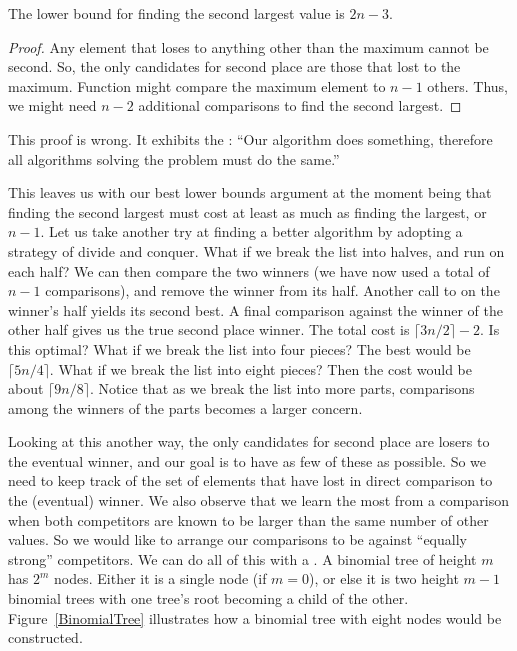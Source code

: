 \begin{theorem}
The lower bound for finding the second largest value is \(2n-3\).
\end{theorem}

\begin{proof}
Any element that loses to anything other than the maximum cannot be
second.
So, the only candidates for second place are those that lost to the
maximum.
Function  might compare the maximum element  to \(n-1\)
others.
Thus, we might need \(n-2\) additional comparisons to find the second
largest.
\end{proof}

This proof is wrong.
It exhibits the :
``Our algorithm does something, therefore all algorithms solving
the problem must do the same.''

This leaves us with our best lower bounds argument at the moment
being that finding the second largest must cost at least as much as
finding the largest, or \(n-1\).
Let us take another try at finding a better algorithm by adopting a
strategy of divide and conquer.
What if we break the list into halves, and run  on each
half?
We can then compare the two winners (we have now used a total of
\(n-1\) comparisons), and remove the winner from its half.
Another call to  on the winner's half yields its second
best.
A final comparison against the winner of the other half gives us the
true second place winner.
The total cost is \(\lceil 3n/2\rceil - 2\).
Is this optimal?
What if we break the list into four pieces?
The best would be \(\lceil 5n/4\rceil\).
What if we break the list into eight pieces?
Then the cost would be about \(\lceil 9n/8\rceil\).
Notice that as we break the list into more parts,
comparisons among the winners of the parts becomes a larger concern.

Looking at this another way, the only candidates for second place
are losers to the eventual winner, and our goal is to have as few of
these as possible.
So we need to keep track of the set of elements that have lost
in direct comparison to the (eventual) winner.
We also observe that we learn the most from a comparison when both
competitors are known to be larger than the same number of other
values.
So we would like to arrange our comparisons to be against ``equally
strong'' competitors.
We can do all of this with a .
A binomial tree of height \(m\) has \(2^m\) nodes.
Either it is a single node (if \(m=0\)), or else it is
two height \(m-1\) binomial trees with one tree's root becoming
a child of the other.
Figure~\ref{BinomialTree} illustrates how a binomial tree with eight
nodes would be constructed.

